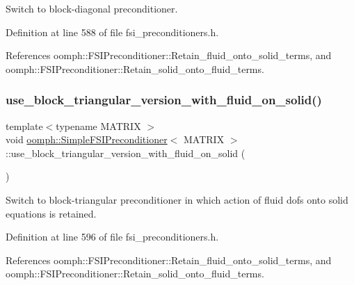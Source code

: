 Switch to block-\/diagonal preconditioner. 



Definition at line 588 of file fsi\+\_\+preconditioners.\+h.



References oomph\+::\+F\+S\+I\+Preconditioner\+::\+Retain\+\_\+fluid\+\_\+onto\+\_\+solid\+\_\+terms, and oomph\+::\+F\+S\+I\+Preconditioner\+::\+Retain\+\_\+solid\+\_\+onto\+\_\+fluid\+\_\+terms.

\mbox{\label{classoomph_1_1SimpleFSIPreconditioner_ae996d56f6e94d88967e8aad4e664ee74}} 
\subsubsection{\texorpdfstring{use\+\_\+block\+\_\+triangular\+\_\+version\+\_\+with\+\_\+fluid\+\_\+on\+\_\+solid()}{use\_block\_triangular\_version\_with\_fluid\_on\_solid()}}
{\footnotesize\ttfamily template$<$typename M\+A\+T\+R\+IX $>$ \\
void \hyperlink{classoomph_1_1SimpleFSIPreconditioner}{oomph\+::\+Simple\+F\+S\+I\+Preconditioner}$<$ M\+A\+T\+R\+IX $>$\+::use\+\_\+block\+\_\+triangular\+\_\+version\+\_\+with\+\_\+fluid\+\_\+on\+\_\+solid (\begin{DoxyParamCaption}{ }\end{DoxyParamCaption})\hspace{0.3cm}{\ttfamily [inline]}}



Switch to block-\/triangular preconditioner in which action of fluid dofs onto solid equations is retained. 



Definition at line 596 of file fsi\+\_\+preconditioners.\+h.



References oomph\+::\+F\+S\+I\+Preconditioner\+::\+Retain\+\_\+fluid\+\_\+onto\+\_\+solid\+\_\+terms, and oomph\+::\+F\+S\+I\+Preconditioner\+::\+Retain\+\_\+solid\+\_\+onto\+\_\+fluid\+\_\+terms.

